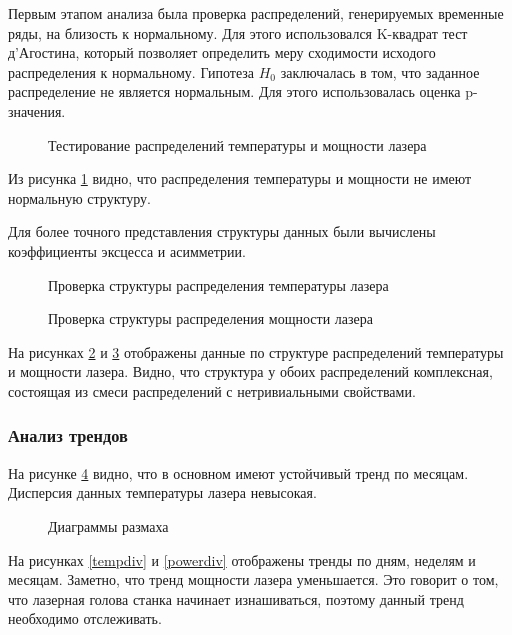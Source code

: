 Первым этапом анализа была проверка распределений,
генерируемых временные ряды, на близость к нормальному.
Для этого использовался K-квадрат тест д'Агостина,
который позволяет определить меру сходимости исходого распределения к нормальному.
Гипотеза $H_0$ заключалась в том, что заданное распределение не является нормальным.
Для этого использовалась оценка p-значения.

\begin{figure}[H]
    \caption{Тестирование распределений температуры и мощности лазера}
    \label{normaltest}
\end{figure}

Из рисунка \ref{normaltest} видно, что распределения температуры и мощности
не имеют нормальную структуру.

Для более точного представления структуры данных
были вычислены коэффициенты эксцесса и асимметрии.

\begin{figure}[H]
    \caption{Проверка структуры распределения температуры лазера}
    \label{tempstruct}
\end{figure}

\begin{figure}[H]
    \caption{Проверка структуры распределения мощности лазера}
    \label{powerstruct}
\end{figure}

На рисунках \ref{tempstruct} и \ref{powerstruct} отображены данные по структуре распределений
температуры и мощности лазера.
Видно, что структура у обоих распределений комплексная,
состоящая из смеси распределений с нетривиальными свойствами.

\subsubsection{Анализ трендов}

На рисунке \ref{trends} видно, что в основном
имеют устойчивый тренд по месяцам.
Дисперсия данных температуры лазера невысокая.

\begin{figure}[H]
    \caption{Диаграммы размаха}
    \label{trends}
\end{figure}

На рисунках \ref{tempdiv} и \ref{powerdiv} отображены
тренды по дням, неделям и месяцам.
Заметно, что тренд мощности лазера уменьшается.
Это говорит о том, что лазерная голова
станка начинает изнашиваться,
поэтому данный тренд необходимо отслеживать.

